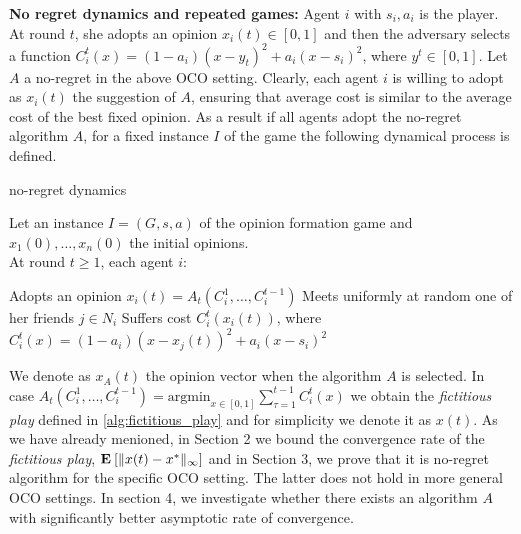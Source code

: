 \noindent \textbf{No regret dynamics and repeated games:}
\noindent Agent $i$ with $s_i,a_i$ is the player. At round $t$, she adopts an opinion $x_i(t) \in [0,1]$ and then the adversary selects a function $C_i^t(x)=(1-a_i)(x-y_t)^2 + a_i(x-s_i)^2$, where $y^t\in [0,1]$.
Let $A$ a no-regret in the above OCO setting. Clearly, each agent $i$ is willing to adopt as $x_i(t)$ the suggestion of $A$, ensuring that average cost is similar
to the average cost of the best fixed opinion. As a result if all agents adopt the no-regret algorithm $A$, for a fixed instance $I$ of the game the following dynamical process
is defined.
\begin{algorithm}
  \caption{no-regret dynamics}
  \label{alg:fno_regret_dynamics}
      Let an instance $I=(G,s,a)$ of the opinion formation game and $x_1(0),\ldots,x_n(0)$ the initial opinions.\\
      At round $t\geq 1$, each agent $i$:
  \begin{algorithmic}[1]
    \State Adopts an opinion $x_i(t)=A_t(C_i^1,\ldots,C_i^{t-1})$
    \State Meets uniformly at random one of her friends $j \in N_i$
    \State Suffers cost $C^t_i(x_i(t))$, where $C^t_i(x) = (1-a_i)(x-x_j(t))^2 + a_i(x-s_i)^2$
\end{algorithmic}
\end{algorithm}

\noindent We denote as $x_A(t)$ the opinion vector when the algorithm $A$ is selected. In case $A_t(C_i^1,\ldots,C_i^{t-1})= \text{argmin}_{x \in [0,1]}\sum_{\tau=1}^{t-1}C_i^t(x)$
we obtain the \emph{fictitious play} defined in \ref{alg:fictitious_play} and for simplicity we denote it as $x(t)$. As we have already menioned, in Section 2 we
bound the convergence rate of the \emph{fictitious play}, $\Exp{\norm{\infty}{x(t)-x^*}}$ and in Section 3, we prove that it is no-regret algorithm for the specific OCO setting. The latter
does not hold in more general OCO settings. In section 4, we investigate whether there exists an algorithm $A$ with significantly better asymptotic rate of convergence.


